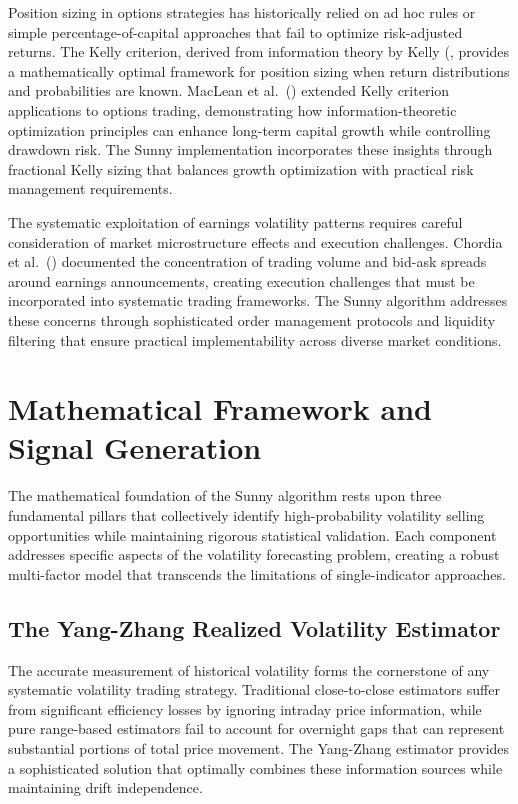 \documentclass[
  american,
  11pt,
  11pt,
  letterpaper,
  onecolumn]{article}
\begin{document}
Position sizing in options strategies has historically relied on ad hoc
rules or simple percentage-of-capital approaches that fail to optimize
risk-adjusted returns. The Kelly criterion, derived from information
theory by Kelly (\textcite{kelly1956}, provides a mathematically optimal
framework for position sizing when return distributions and
probabilities are known. MacLean et al.~(\textcite{maclean2010})
extended Kelly criterion applications to options trading, demonstrating
how information-theoretic optimization principles can enhance long-term
capital growth while controlling drawdown risk. The Sunny implementation
incorporates these insights through fractional Kelly sizing that
balances growth optimization with practical risk management
requirements.

The systematic exploitation of earnings volatility patterns requires
careful consideration of market microstructure effects and execution
challenges. Chordia et al.~(\textcite{chordia2002}) documented the
concentration of trading volume and bid-ask spreads around earnings
announcements, creating execution challenges that must be incorporated
into systematic trading frameworks. The Sunny algorithm addresses these
concerns through sophisticated order management protocols and liquidity
filtering that ensure practical implementability across diverse market
conditions.

\section{Mathematical Framework and Signal
Generation}\label{mathematical-framework-and-signal-generation}

The mathematical foundation of the Sunny algorithm rests upon three
fundamental pillars that collectively identify high-probability
volatility selling opportunities while maintaining rigorous statistical
validation. Each component addresses specific aspects of the volatility
forecasting problem, creating a robust multi-factor model that
transcends the limitations of single-indicator approaches.

\subsection{The Yang-Zhang Realized Volatility
Estimator}\label{the-yang-zhang-realized-volatility-estimator}

The accurate measurement of historical volatility forms the cornerstone
of any systematic volatility trading strategy. Traditional
close-to-close estimators suffer from significant efficiency losses by
ignoring intraday price information, while pure range-based estimators
fail to account for overnight gaps that can represent substantial
portions of total price movement. The Yang-Zhang estimator provides a
sophisticated solution that optimally combines these information sources
while maintaining drift independence.
\end{document}
